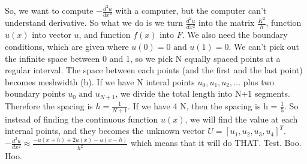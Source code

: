 So, we want to compute \(-\frac{d^2 u}{dx^2}\) with a computer, but the computer can't understand derivative. 
So what we do is we turn \(\frac{d^2 u}{dx^2}\)  into the matrix \(\frac{K^2}{h}\),
function \(u(x)\)  into vector \(u\), and function \(f(x)\) into \(F\).
We also need the boundary conditions, which are given where \(u(0) = 0 \text{ and } u(1)=0\). 
We can't pick out the infinite space between 0 and 1, so we pick N equally spaced points at a regular interval. 
The space between each points (and the first and the last point) becomes meshwidth (h). 
If we have N interal points \(u_0, u_1, u_2, \ldots\) plus two boundary points \(u_0 \text{ and } u_{N+1}\), we divide the total length into N+1 segments.
Therefore the spacing is \(h = \frac{1}{N+1}\).
If we have 4 N, then the spacing is h = \(\frac{1}{5}\).
So instead of finding the continuous function \(u(x)\), we will find the value at each internal points, and they becomes the unknown vector \(U = [u_1, u_2, u_3, u_4]^T\).
\medbreak
\(-\frac{d^2 u}{dx^2} \approx  \frac{-u(x+h) + 2u(x) - u(x-h)}{h^2}\) which means that it will do THAT. Test. Boo. Hoo.
